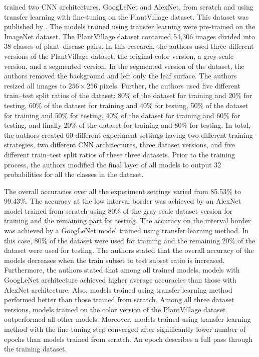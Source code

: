 \documentclass{BachelorBUI}
\begin{document}
        \textcite{Mohanty:2016} trained two CNN architectures, GoogLeNet and AlexNet, from scratch and using transfer learning with fine-tuning on the PlantVillage dataset. This dataset was published by \textcite{Hughes:2015}. The models trained using transfer learning were pre-trained on the ImageNet dataset. The PlantVillage dataset contained 54,306 images divided into 38 classes of plant--disease pairs. In this research, the authors used three different versions of the PlantVillage dataset: the original color version, a grey-scale version, and a segmented version. In the segmented version of the dataset, the authors removed the background and left only the leaf surface. The authors resized all images to $256 \times 256$ pixels. Further, the authors used five different train--test split ratios of the dataset: 80\% of the dataset for training and 20\% for testing, 60\% of the dataset for training and 40\% for testing, 50\% of the dataset for training and 50\% for testing, 40\% of the dataset for training and 60\% for testing, and finally 20\% of the dataset for training and 80\% for testing. In total, the authors created 60 different experiment settings having two different training strategies, two different CNN architectures, three dataset versions, and five different train--test split ratios of these three datasets. Prior to the training process, the authors modified the final layer of all models to output 32 probabilities for all the classes in the dataset. 
        
        The overall accuracies over all the experiment settings varied from 85.53\% to 99.43\%. The accuracy at the low interval border was achieved by an AlexNet model trained from scratch using 80\% of the gray-scale dataset version for training and the remaining part for testing. The accuracy on the interval border was achieved by a GoogLeNet model trained using transfer learning method. In this case, 80\% of the dataset were used for training and the remaining 20\% of the dataset were used for testing. The authors stated that the overall accuracy of the models decreases when the train subset to test subset ratio is increased. Furthermore, the authors stated that among all trained models, models with GoogLeNet architecture achieved higher average accuracies than those with AlexNet architecture. Also, models trained using transfer learning method performed better than those trained from scratch. Among all three dataset versions, models trained on the color version of the PlantVillage dataset outperformed all other models. Moreover, models trained using transfer learning method with the fine-tuning step converged after significantly lower number of epochs than models trained from scratch. An epoch describes a full pass through the training dataset.
\end{document}
